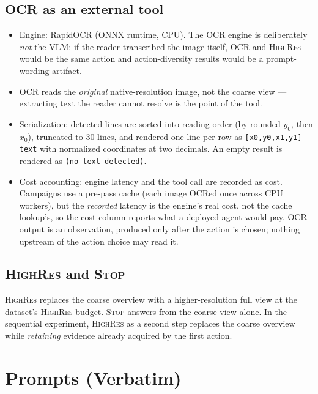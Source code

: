 \documentclass[10pt]{article}
\begin{document}
\subsection{OCR as an external tool}

\begin{itemize}
\item Engine: RapidOCR (ONNX runtime, CPU). The OCR engine is deliberately
  \emph{not} the VLM: if the reader transcribed the image itself, OCR and
  \textsc{HighRes} would be the same action and action-diversity results
  would be a prompt-wording artifact.
\item OCR reads the \emph{original} native-resolution image, not the coarse
  view --- extracting text the reader cannot resolve is the point of the
  tool.
\item Serialization: detected lines are sorted into reading order (by
  rounded $y_0$, then $x_0$), truncated to 30 lines, and rendered one line
  per row as \verb|[x0,y0,x1,y1] text| with normalized coordinates at two
  decimals. An empty result is rendered as \verb|(no text detected)|.
\item Cost accounting: engine latency and the tool call are recorded as
  cost. Campaigns use a pre-pass cache (each image OCRed once across CPU
  workers), but the \emph{recorded} latency is the engine's real cost, not
  the cache lookup's, so the cost column reports what a deployed agent
  would pay. OCR output is an observation, produced only after the action
  is chosen; nothing upstream of the action choice may read it.
\end{itemize}

\subsection{\textsc{HighRes} and \textsc{Stop}}

\textsc{HighRes} replaces the coarse overview with a higher-resolution full
view at the dataset's \textsc{HighRes} budget. \textsc{Stop} answers from
the coarse view alone. In the sequential experiment, \textsc{HighRes} as a
second step replaces the coarse overview while \emph{retaining} evidence
already acquired by the first action.

\section{Prompts (Verbatim)}
\label{sec:prompts}
\end{document}
